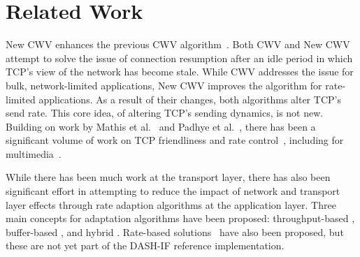 \documentclass[10pt,sigconf,anonymous]{acmart}
\begin{document}
\section{Related Work}
\label{sec:related}

New CWV enhances the previous CWV algorithm~\cite{rfc2861-2000-padhye-congestion-window-validation}. Both CWV and New CWV attempt to solve the issue of connection resumption after an idle period in which TCP's view of the network has become stale. While CWV addresses the issue for bulk, network-limited applications, New CWV improves the algorithm for rate-limited applications. As a result of their changes, both algorithms alter TCP's send rate. This core idea, of altering TCP's sending dynamics, is not new. Building on work by Mathis et al.~\cite{Mathis-1997-the-macroscopic-behavior-tcp} and Padhye et al.~\cite{Padhye-1998-modelling-tcp-throughput}, there has been a significant volume of work on TCP friendliness and rate control~\cite{rfc-5348-tfrc,Rossi-2010-ledbat,Arun-2018-copa}, including for multimedia~\cite{Carlucci-2016-Analysis-WebRTC,Choi-2007-fairer-tfrc}.

While there has been much work at the transport layer, there has also been significant effort in attempting to reduce the impact of network and transport layer effects through rate adaption algorithms at the application layer. Three main concepts for adaptation algorithms have been proposed: throughput-based \cite{Sun-2016-cs2p, Jiang-2012-improving-fairness-http-video-festive}, buffer-based \cite{Spiteri-2016-BOLA,Huang-2015-A-buffer-based-approach-to-rate-adaptation-bba}, and hybrid \cite{Spiteri-2019-from-theory-to-practice-sabre,Wang-2016-squad}. Rate-based solutions~\cite{Li-2014-probe-and-adapt-panda,Liu-2011-rate-adaptation} have also been proposed, but these are not yet part of the DASH-IF reference implementation.

\end{document}

